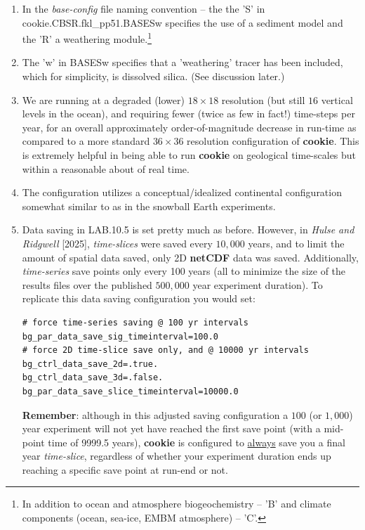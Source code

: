\begin{enumerate}[noitemsep]

\vspace{1mm}
\item In the \textit{base-config} file naming convention -- the the '\textsf{\footnotesize S}' in \textsf{\footnotesize cookie.CBSR.fkl\_pp51.BASESw} specifies the use of a sediment model and the '\textsf{\footnotesize R}' a weathering module.\footnote{In addition to ocean and atmosphere biogeochemistry -- '\textsf{\footnotesize B}' and climate components (ocean, sea-ice, EMBM atmosphere) -- '\textsf{\footnotesize C}'.}

\vspace{1mm}
\item The '\textsf{\footnotesize w}' in \textsf{\footnotesize BASESw} specifies that a 'weathering' tracer has been included, which for simplicity, is dissolved silica. (See discussion later.)

\vspace{1mm}
\item We are running at a degraded (lower) \(18\times18\) resolution (but still \(16\) vertical levels in the ocean), and requiring fewer (twice as few in fact!) time-steps per year, for an overall approximately order-of-magnitude decrease in run-time as compared to a more standard \(36\times36\) resolution configuration of \textbf{cookie}. This is extremely helpful in being able to run \textbf{cookie} on geological time-scales but within a reasonable about of real time.

\vspace{1mm}
\item The configuration utilizes a conceptual/idealized continental configuration somewhat similar to as in the snowball Earth experiments.

\vspace{1mm}
\item Data saving in \textsf{\footnotesize LAB.10.5} is set pretty much as before. However, in \textit{Hulse and Ridgwell} [2025], \textit{time-slices} were saved every $10,000$ years, and to limit the amount of spatial data saved, only 2D \textbf{netCDF} data was saved. Additionally, \textit{time-series} save points only every 100 years (all to minimize the size of the results files over the published $500,000$ year experiment duration). To replicate this data saving configuration you would set:
\vspace{-1mm}\small\begin{verbatim}
# force time-series saving @ 100 yr intervals
bg_par_data_save_sig_timeinterval=100.0
# force 2D time-slice save only, and @ 10000 yr intervals
bg_ctrl_data_save_2d=.true.
bg_ctrl_data_save_3d=.false.
bg_par_data_save_slice_timeinterval=10000.0
\end{verbatim}\normalsize\vspace{-1mm}
\textbf{Remember}: although in this adjusted saving configuration a $100$ (or $1,000$) year experiment will not yet have reached the first save point (with a mid-point time of 9999.5 years), \textbf{cookie} is configured to \uline{always} save you a final year \textit{time-slice}, regardless of whether your experiment duration ends up reaching a specific save point at run-end or not.


\end{enumerate}
